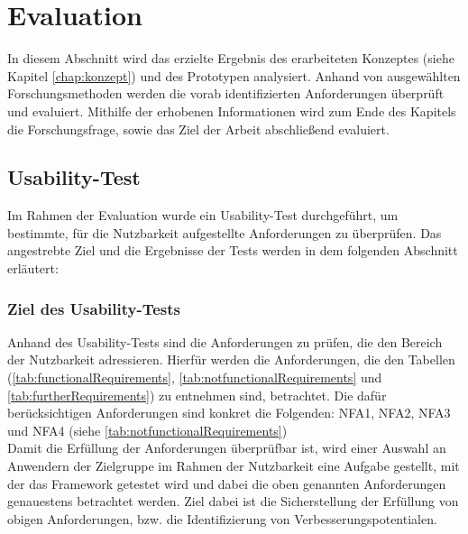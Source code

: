\chapter{Evaluation}
\label{chap:evaluation}
In diesem Abschnitt wird das erzielte Ergebnis des erarbeiteten Konzeptes (siehe Kapitel \ref{chap:konzept}) und des 
Prototypen analysiert. Anhand von ausgewählten Forschungsmethoden werden die vorab identifizierten Anforderungen überprüft 
und evaluiert. Mithilfe der erhobenen Informationen wird zum Ende des Kapitels die Forschungsfrage, sowie das
Ziel der Arbeit abschließend evaluiert. 

\section{Usability-Test}
    Im Rahmen der Evaluation wurde ein Usability-Test durchgeführt, um bestimmte, für die Nutzbarkeit aufgestellte Anforderungen zu 
    überprüfen.
    Das angestrebte Ziel und die Ergebnisse der Tests werden in dem folgenden Abschnitt erläutert:
    
    \subsection{Ziel des Usability-Tests}
        Anhand des Usability-Tests sind die Anforderungen zu prüfen, die den Bereich der Nutzbarkeit adressieren. 
        Hierfür werden die Anforderungen, die den Tabellen (\ref{tab:functionalRequirements}, \ref{tab:notfunctionalRequirements} und \ref{tab:furtherRequirements}) 
        zu entnehmen sind, betrachtet. Die dafür berücksichtigen Anforderungen sind konkret die Folgenden: NFA1, NFA2, NFA3 und NFA4 (siehe \ref{tab:notfunctionalRequirements})
        \\
        Damit die Erfüllung der Anforderungen überprüfbar ist, wird einer Auswahl an Anwendern der Zielgruppe im Rahmen der Nutzbarkeit 
        eine Aufgabe gestellt, mit der das Framework getestet wird und dabei die oben genannten Anforderungen genauestens betrachtet werden. 
        Ziel dabei ist die Sicherstellung der Erfüllung von obigen Anforderungen, bzw. die Identifizierung von Verbesserungspotentialen. 

